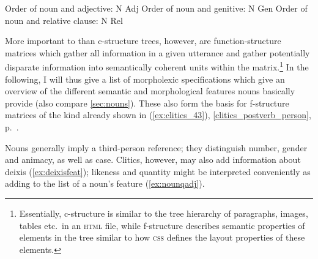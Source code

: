 \pex
\a Order of noun and adjective: N Adj
\a Order of noun and genitive: N Gen
\a Order of noun and relative clause: N Rel
\xe

More important to \Lfg{} than c-structure trees, however, are
function-structure matrices which gather all information in a given utterance
and gather potentially disparate information into semantically coherent units
within the matrix.\footnote{Essentially, c-structure is similar to the tree
hierarchy of paragraphs, images, tables etc.\ in an \textsc{html} file, while
f-structure describes semantic properties of elements in the tree similar to
how \textsc{css} defines the layout properties of these elements.} In the
following, I will thus give a list of morpholexic specifications which give an
overview of the different semantic and morphological features nouns basically
provide (also compare \autoref{sec:nouns}). These also form the basis for
f-structure matrices of the kind already shown in (\ref{ex:clitics_43}),
\autoref{clitics_postverb_person}, p.~\pageref{ex:clitics_43}.

\begin{morphlex}
\ex\label{ex:nounmorphlex}%
\xe
\end{morphlex}

Nouns generally imply a third-person reference; they distinguish number, gender
and animacy, as well as case. Clitics, however, may also add information about
deixis (\ref{ex:deixisfeat}); likeness and quantity might be interpreted
conveniently as adding to the list of a noun's \Adjc{} feature 
(\ref{ex:nounqadj}).

\begin{morphlex}
\ex\label{ex:deixisfeat}
\xe
\end{morphlex}

